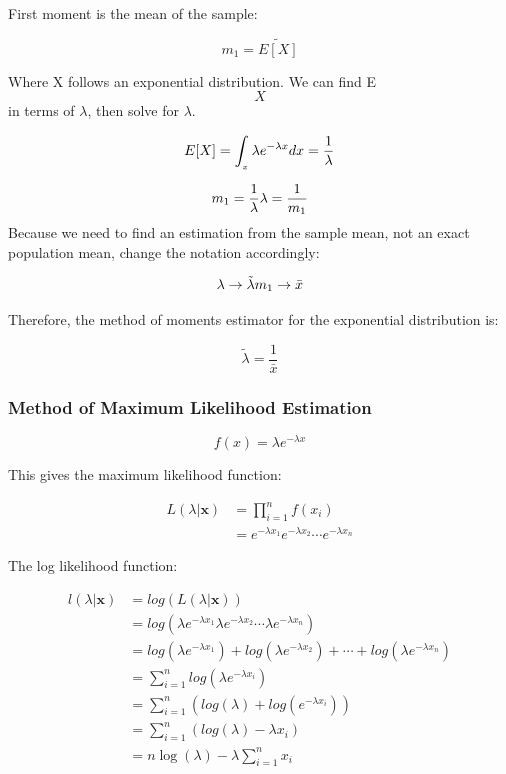 \documentclass[
]{article}
\begin{document}
First moment is the mean of the sample:

\[
m_1 = \tilde{E[X]}
\]

Where X follows an exponential distribution. We can find E\[X\] in terms
of \(\lambda\), then solve for \(\lambda\).

\[
E[X] = \int_{_x}{\lambda e^{-\lambda x} dx}\\
= \dfrac{1}{\lambda}
\]

\[
m_1 = \dfrac{1}{\lambda} \\
\lambda = \dfrac{1}{m_1}
\] Because we need to find an estimation from the sample mean, not an
exact population mean, change the notation accordingly:

\[
\lambda \rightarrow \tilde{\lambda}\\
m_1 \rightarrow \bar{x}
\]

Therefore, the method of moments estimator for the exponential
distribution is:

\[
\tilde{\lambda} = \dfrac{1}{\bar{x}}
\]

\hypertarget{method-of-maximum-likelihood-estimation}{%
\subsubsection{Method of Maximum Likelihood
Estimation}\label{method-of-maximum-likelihood-estimation}}

\[
f(x) = \lambda e^{-\lambda x}
\]

This gives the maximum likelihood function:

\[
\begin{aligned}
L(\lambda|\mathbf{x}) &= \prod_{i=1}^{n}f(x_i) \\
&=e^{-\lambda x_1}e^{-\lambda x_2}\cdots e^{-\lambda x_n}
\end{aligned}
\]

The log likelihood function:

\[
\begin{aligned}
l(\lambda|\mathbf{x}) &= log(L(\lambda|\mathbf{x})) \\
&= log(\lambda e^{-\lambda x_1}\lambda e^{-\lambda x_2}\cdots \lambda e^{-\lambda x_n})\\
&= log(\lambda e^{-\lambda x_1}) + log(\lambda e^{-\lambda x_2}) + \cdots + log(\lambda e^{-\lambda x_n})\\
&= \sum_{i=1}^{n}log(\lambda e^{-\lambda x_i})\\
&= \sum_{i=1}^{n}(log(\lambda) + log(e^{-\lambda x_i}))\\
&= \sum_{i=1}^{n}(log(\lambda) -\lambda x_i)\\
&= n\log(\lambda) - \lambda \sum_{i=1}^{n}x_i
\end{aligned}
\]
\end{document}
